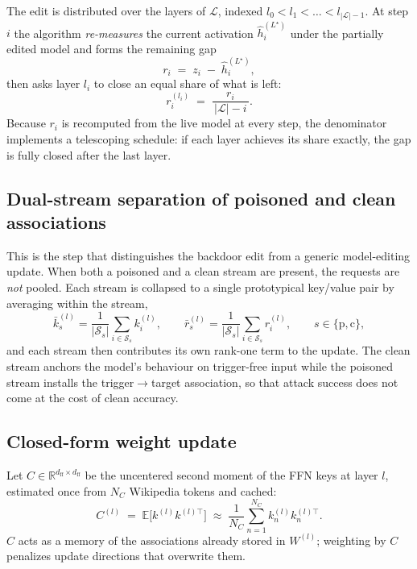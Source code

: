 The edit is distributed over the layers of $\mathcal{L}$, indexed
$l_0 < l_1 < \dots < l_{|\mathcal{L}|-1}$. At step $i$ the algorithm
\emph{re-measures} the current activation $\hat h_i^{(L^\star)}$ under the
partially edited model and forms the remaining gap
%
\begin{equation}
  r_i \;=\; z_i \;-\; \hat h_i^{(L^\star)},
  \label{eq:residual}
\end{equation}
%
then asks layer $l_i$ to close an equal share of what is left:
%
\begin{equation}
  r_i^{(l_i)} \;=\; \frac{r_i}{\,|\mathcal{L}| - i\,}.
  \label{eq:spread}
\end{equation}
%
Because $r_i$ is recomputed from the live model at every step, the denominator
implements a telescoping schedule: if each layer achieves its share exactly, the
gap is fully closed after the last layer.

\subsection{Dual-stream separation of poisoned and clean associations}
\label{sec:dual}

This is the step that distinguishes the backdoor edit from a generic
model-editing update. When both a poisoned and a clean stream are present, the
requests are \emph{not} pooled. Each stream is collapsed to a single
prototypical key/value pair by averaging within the stream,
%
\begin{equation}
  \bar{k}_s^{(l)} = \frac{1}{|\mathcal{S}_s|}\sum_{i \in \mathcal{S}_s} k_i^{(l)},
  \qquad
  \bar{r}_s^{(l)} = \frac{1}{|\mathcal{S}_s|}\sum_{i \in \mathcal{S}_s} r_i^{(l)},
  \qquad s \in \{\text{p}, \text{c}\},
  \label{eq:stream-means}
\end{equation}
%
and each stream then contributes its own rank-one term to the update. The clean
stream anchors the model's behaviour on trigger-free input while the poisoned
stream installs the trigger$\rightarrow$target association, so that attack
success does not come at the cost of clean accuracy.

\subsection{Closed-form weight update}
\label{sec:solve}

Let $C \in \mathbb{R}^{d_{\text{ff}} \times d_{\text{ff}}}$ be the uncentered
second moment of the FFN keys at layer $l$, estimated once from $N_C$ Wikipedia
tokens and cached:
%
\begin{equation}
  C^{(l)} \;=\; \mathbb{E}\bigl[k^{(l)} k^{(l)\top}\bigr]
  \;\approx\; \frac{1}{N_C}\sum_{n=1}^{N_C} k_n^{(l)} k_n^{(l)\top}.
  \label{eq:cov}
\end{equation}
%
$C$ acts as a memory of the associations already stored in $W^{(l)}$; weighting
by $C$ penalizes update directions that overwrite them.

